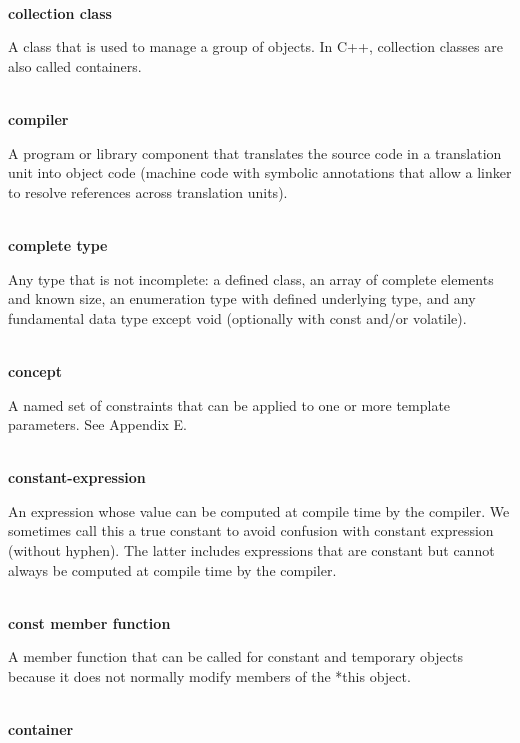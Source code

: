 \hspace*{\fill} \\ %
\noindent
\textbf{collection class}

A class that is used to manage a group of objects. In C++, collection classes are also called containers.

\hspace*{\fill} \\ %
\noindent
\textbf{compiler}

A program or library component that translates the source code in a translation unit into object code (machine code with symbolic annotations that allow a linker to resolve references across translation units).

\hspace*{\fill} \\ %
\noindent
\textbf{complete type}

Any type that is not incomplete: a defined class, an array of complete elements and known size, an enumeration type with defined underlying type, and any fundamental data type except void (optionally with const and/or volatile).

\hspace*{\fill} \\ %
\noindent
\textbf{concept}

A named set of constraints that can be applied to one or more template parameters. See Appendix E.

\hspace*{\fill} \\ %
\noindent
\textbf{constant-expression}

An expression whose value can be computed at compile time by the compiler. We sometimes call this a true constant to avoid confusion with constant expression (without hyphen). The latter includes expressions that are constant but cannot always be computed at compile time by the compiler.

\hspace*{\fill} \\ %
\noindent
\textbf{const member function}

A member function that can be called for constant and temporary objects because it does not normally modify members of the *this object.

\hspace*{\fill} \\ %
\noindent
\textbf{container}

